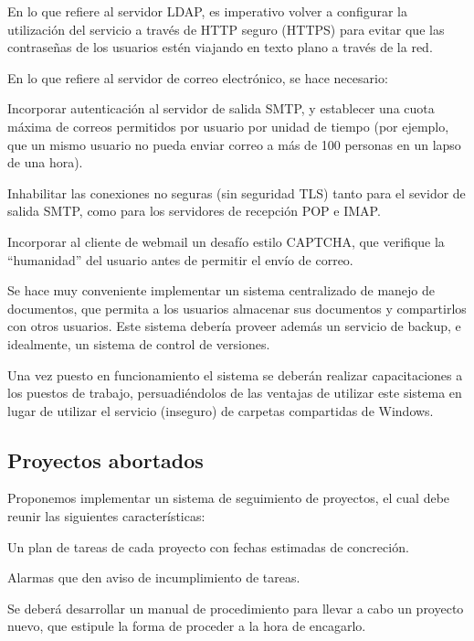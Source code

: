 \documentclass[a4paper,11pt,oneside]{article}
\begin{document}
\begin{description}
En lo que refiere al servidor LDAP, es imperativo volver a configurar
la utilización del servicio a través de HTTP seguro (HTTPS) para
evitar que las contraseñas de los usuarios estén viajando en texto
plano a través de la red.

En lo que refiere al servidor de correo electrónico, se hace necesario:
\begin{itemize*}
\item Incorporar autenticación al servidor de salida SMTP, y
  establecer una cuota máxima de correos permitidos por usuario por
  unidad de tiempo (por ejemplo, que un mismo usuario no pueda enviar
  correo a más de 100 personas en un lapso de una hora).
\item Inhabilitar las conexiones no seguras (sin seguridad TLS) tanto
  para el sevidor de salida SMTP, como para los servidores de
  recepción POP e IMAP.
\item Incorporar al cliente de webmail un desafío estilo CAPTCHA, que
  verifique la ``humanidad'' del usuario antes de permitir el envío de
  correo.
\end{itemize*}

Se hace muy conveniente implementar un sistema centralizado de manejo
de documentos, que permita a los usuarios almacenar sus documentos y
compartirlos con otros usuarios. Este sistema debería proveer además
un servicio de backup, e idealmente, un sistema de control de
versiones.

Una vez puesto en funcionamiento el sistema se deberán realizar
capacitaciones a los puestos de trabajo, persuadiéndolos de las
ventajas de utilizar este sistema en lugar de utilizar el servicio
(inseguro) de carpetas compartidas de Windows.

\subsection*{Proyectos abortados}
Proponemos implementar un sistema de seguimiento de proyectos, el cual
debe reunir las siguientes características:
\begin{itemize*}
\item Un plan de tareas de cada proyecto con fechas estimadas de
  concreción.
\item Alarmas que den aviso de incumplimiento de tareas.
\end{itemize*}
Se deberá desarrollar un manual de procedimiento para llevar a cabo un
proyecto nuevo, que estipule la forma de proceder a la hora de
encagarlo.


\end{description}
\end{document}
